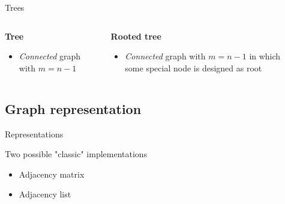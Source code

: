 \documentclass[compress]{beamer}
\begin{document}
\begin{frame}{Trees}
  \begin{columns}
    \begin{block}{\textbf{Tree}}
      \begin{itemize}
      \item \emph{Connected} graph with $m = n - 1$
      \end{itemize}
    \end{block}
    \begin{center}
    \scalebox{0.7}{}
    \end{center}
    \begin{block}{\textbf{Rooted tree}}
      \begin{itemize}
      \item \emph{Connected} graph with $m = n - 1$ in which some special node is designed as root
      \end{itemize}
    \end{block}
    \begin{center}
    \scalebox{0.8}{}
    \end{center}
  \end{columns}
\end{frame}

\subsection{Graph representation}

\begin{frame}{Representations}
  \begin{block}{}
    Two possible "classic" implementations
  \end{block}
  \begin{itemize}
    \item Adjacency matrix
    \item Adjacency list
  \end{itemize}
\end{frame}
\end{document}
